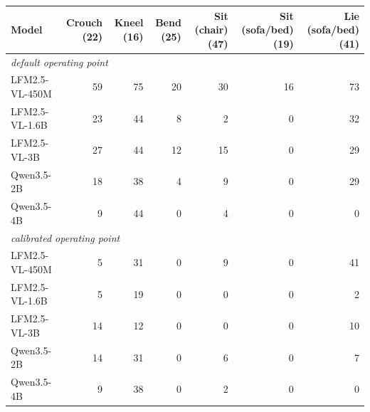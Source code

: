 \begin{tabular}{lrrrrrr}
\toprule
Model & Crouch (22) & Kneel (16) & Bend (25) & Sit (chair) (47) & Sit (sofa/bed) (19) & Lie (sofa/bed) (41) \\
\midrule
\multicolumn{7}{l}{\textit{default operating point}} \\
LFM2.5-VL-450M & 59 & 75 & 20 & 30 & 16 & 73 \\
LFM2.5-VL-1.6B & 23 & 44 & 8 & 2 & 0 & 32 \\
LFM2.5-VL-3B & 27 & 44 & 12 & 15 & 0 & 29 \\
Qwen3.5-2B & 18 & 38 & 4 & 9 & 0 & 29 \\
Qwen3.5-4B & 9 & 44 & 0 & 4 & 0 & 0 \\
\multicolumn{7}{l}{\textit{calibrated operating point}} \\
LFM2.5-VL-450M & 5 & 31 & 0 & 9 & 0 & 41 \\
LFM2.5-VL-1.6B & 5 & 19 & 0 & 0 & 0 & 2 \\
LFM2.5-VL-3B & 14 & 12 & 0 & 0 & 0 & 10 \\
Qwen3.5-2B & 14 & 31 & 0 & 6 & 0 & 7 \\
Qwen3.5-4B & 9 & 38 & 0 & 2 & 0 & 0 \\
\bottomrule
\end{tabular}
